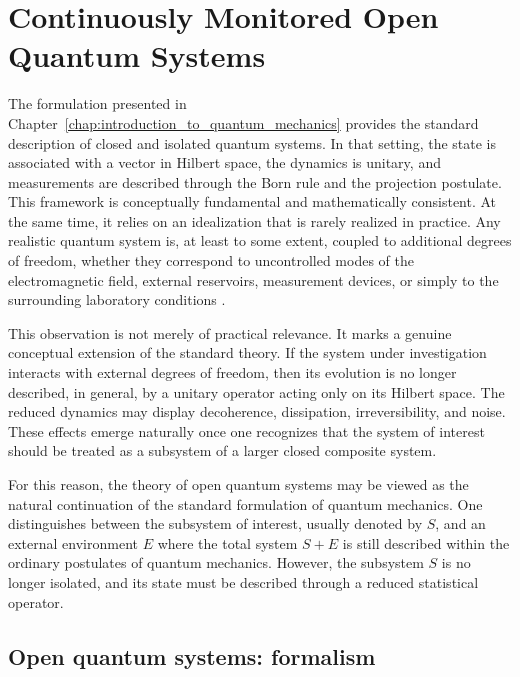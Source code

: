 \chapter{Continuously Monitored Open Quantum Systems}

The formulation presented in Chapter~\ref{chap:introduction_to_quantum_mechanics} provides the standard description of closed and isolated quantum systems. In that setting, the state is associated with a vector in Hilbert space, the dynamics is unitary, and measurements are described through the Born rule and the projection postulate. This framework is conceptually fundamental and mathematically consistent. At the same time, it relies on an idealization that is rarely realized in practice. Any realistic quantum system is, at least to some extent, coupled to additional degrees of freedom, whether they correspond to uncontrolled modes of the electromagnetic field, external reservoirs, measurement devices, or simply to the surrounding laboratory conditions \cite{Vac24,ParisTools12}.

This observation is not merely of practical relevance. It marks a genuine conceptual extension of the standard theory. If the system under investigation interacts with external degrees of freedom, then its evolution is no longer described, in general, by a unitary operator acting only on its Hilbert space. The reduced dynamics may display decoherence, dissipation, irreversibility, and noise. These effects emerge naturally once one recognizes that the system of interest should be treated as a subsystem of a larger closed composite system.

For this reason, the theory of open quantum systems may be viewed as the natural continuation of the standard formulation of quantum mechanics. One distinguishes between the subsystem of interest, usually denoted by \(S\), and an external environment \(E\) where the total system \(S+E\) is still described within the ordinary postulates of quantum mechanics. However, the subsystem \(S\) is no longer isolated, and its state must be described through a reduced statistical operator.

\section{Open quantum systems: formalism}
\label{sec:open_quantum_systems_and_generalized_postulates}



